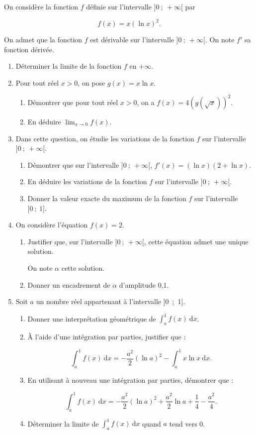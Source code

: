 On considère la fonction $f$ définie sur l'intervalle $]0~;~+\infty[$ par 

\[f(x) = x(\ln x)^2.\]

On admet que la fonction $f$ est dérivable sur l'intervalle $]0~;~+\infty[$. On note $f'$ sa fonction dérivée.

\medskip

\begin{enumerate}
\item Déterminer la limite de la fonction $f$ en $+\infty$.
\item Pour tout réel $x > 0$, on pose $g(x) = x\ln x$.
	\begin{enumerate}
		\item Démontrer que pour tout réel $x > 0$, on a $f(x) = 4\left(g\left(\sqrt x\right)\right)^2$.
		\item En déduire $\displaystyle\lim_{x \to 0} f(x)$.
	\end{enumerate}
\item Dans cette question, on étudie les variations de la fonction $f$ sur l'intervalle $]0~;~+\infty[$.
	\begin{enumerate}
		\item Démontrer que sur l'intervalle $]0~;~+\infty[$, \: $f'(x) = (\ln x)(2 + \ln x)$.
		\item En déduire les variations de la fonction $f$ sur l'intervalle $]0~;~+\infty[$.
		\item Donner la valeur exacte du maximum de la fonction $f$ sur l'intervalle $]0~;~1]$.
	\end{enumerate}
\item On considère l'équation $f (x) = 2$.
	\begin{enumerate}
		\item Justifier que, sur l'intervalle $]0~;~+\infty[$, cette équation admet une unique solution.

On note $\alpha$ cette solution.
		\item Donner un encadrement de $\alpha$ d'amplitude 0,1.
	\end{enumerate}
\item Soit $a$ un nombre réel appartenant à l'intervalle ]0~;~1].
	\begin{enumerate}
		\item Donner une interprétation géométrique de $\displaystyle\int_a^1 f(x)\: \text{d}x$.
		\item À l'aide d'une intégration par parties, justifier que : 

\[\displaystyle\int_a^1 f(x)\: \text{d}x = - \dfrac{a^2}{2}(\ln a)^2 - \displaystyle\int_a^1 x \ln x\: \text{d}x.\]

		\item En utilisant à nouveau une intégration par parties, démontrer que :

\[\displaystyle\int_a^1 f(x)\: \text{d}x =  - \dfrac{a^2}{2}(\ln a)^2 + \dfrac{a^2}{2} \ln a + \dfrac14 - \dfrac{a^2}{4}.\]

		\item Déterminer la limite de $\displaystyle\int_a^1 f(x)\: \text{d}x$ quand $a$ tend vers 0.
	\end{enumerate}
\end{enumerate}
